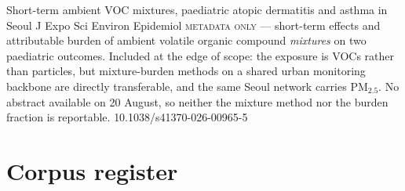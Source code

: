 \documentclass[10pt]{article}
\begin{document}

{Short-term ambient VOC mixtures, paediatric atopic dermatitis and asthma in Seoul}
{J Expo Sci Environ Epidemiol}
{\textsc{metadata only} --- short-term effects and attributable burden of ambient volatile
organic compound \emph{mixtures} on two paediatric outcomes. Included at the edge of scope:
the exposure is VOCs rather than particles, but mixture-burden methods on a shared urban
monitoring backbone are directly transferable, and the same Seoul network carries
PM$_{2.5}$. No abstract available on 20 August, so neither the mixture method nor the
burden fraction is reportable.}
{10.1038/s41370-026-00965-5}

\vspace{4mm}

\section*{\sffamily\bfseries\color{Deep}Corpus register}
\vspace{-1.5mm}{\color{Amber}\rule{\linewidth}{1.1pt}}\vspace{2.5mm}


\end{document}
